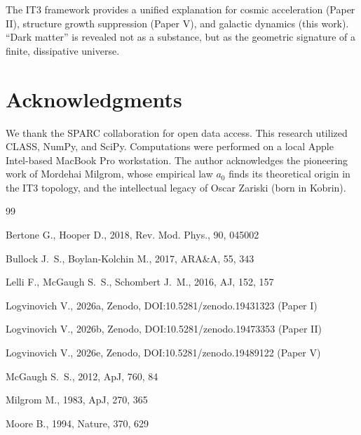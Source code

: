 \documentclass[12pt,a4paper]{article}
\begin{document}
The IT3 framework provides a unified explanation for cosmic acceleration (Paper II), structure growth suppression (Paper V), and galactic dynamics (this work). ``Dark matter'' is revealed not as a substance, but as the geometric signature of a finite, dissipative universe.

\section*{Acknowledgments}

We thank the SPARC collaboration for open data access. This research utilized CLASS, NumPy, and SciPy. Computations were performed on a local Apple Intel-based MacBook Pro workstation. The author acknowledges the pioneering work of Mordehai Milgrom, whose empirical law $a_0$ finds its theoretical origin in the IT3 topology, and the intellectual legacy of Oscar Zariski (born in Kobrin).

\begin{thebibliography}{99}

Bertone G., Hooper D., 2018, Rev. Mod. Phys., 90, 045002

Bullock J.~S., Boylan-Kolchin M., 2017, ARA\&A, 55, 343

Lelli F., McGaugh S.~S., Schombert J.~M., 2016, AJ, 152, 157

Logvinovich V., 2026a, Zenodo, DOI:10.5281/zenodo.19431323 (Paper I)

Logvinovich V., 2026b, Zenodo, DOI:10.5281/zenodo.19473353 (Paper II)

Logvinovich V., 2026e, Zenodo, DOI:10.5281/zenodo.19489122 (Paper V)

McGaugh S.~S., 2012, ApJ, 760, 84

Milgrom M., 1983, ApJ, 270, 365

Moore B., 1994, Nature, 370, 629

\end{thebibliography}
\end{document}
